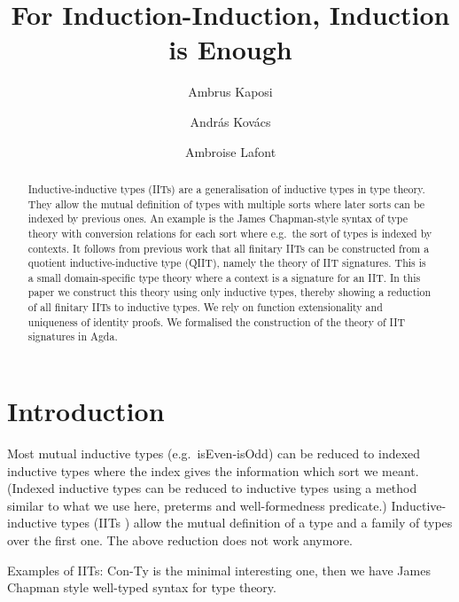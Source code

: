 \documentclass[a4paper,UKenglish,cleveref, autoref]{lipics-v2019}
\title{For Induction-Induction, Induction is Enough} %
\author{Ambrus Kaposi}{E{\"o}tv{\"o}s Lor{\'a}nd University, Budapest, Hungary}{akaposi@inf.elte.hu}{https://orcid.org/0000-0001-9897-8936}{this author was supported by Thematic Excellence Programme, Industry and Digitization Subprogramme (NRDI Office, 2019) and by the European Union, co-financed by the European Social Fund (EFOP-3.6.2-16-2017-00013, Thematic Fundamental Research Collaborations Grounding Innovation in Informatics and Infocommunication).}%
\author{Andr{\'a}s Kov{\'a}cs}{E{\"o}tv{\"o}s Lor{\'a}nd University, Budapest, Hungary}{kovacsandras@inf.elte.hu}{https://orcid.org/0000-0002-6375-9781}{this author was supported by the European Union, co-financed by the European Social Fund (EFOP-3.6.3-VEKOP-16-2017-00002).}
\author{Ambroise Lafont}{IMT Atlantique, Inria, LS2N CNRS, Nantes, France}{ambroise.lafont@inria.fr}{https://orcid.org/0000-0002-9299-641X}{}
\begin{document}
\maketitle

\begin{abstract}
  Inductive-inductive types (IITs) are a generalisation of inductive types in
  type theory. They allow the mutual definition of types with multiple sorts
  where later sorts can be indexed by previous ones. An example is the James
  Chapman-style syntax of type theory with conversion relations for each sort
  where e.g.\ the sort of types is indexed by contexts. It follows from previous
  work that all finitary IITs can be constructed from a quotient
  inductive-inductive type (QIIT), namely the theory of IIT signatures. This is
  a small domain-specific type theory where a context is a signature for an
  IIT. In this paper we construct this theory using only inductive types,
  thereby showing a reduction of all finitary IITs to inductive types.  We rely
  on function extensionality and uniqueness of identity proofs. We formalised
  the construction of the theory of IIT signatures in Agda.

\end{abstract}

\section{Introduction}
\label{sec:intro}




Most mutual inductive types (e.g.\ isEven-isOdd) can be reduced to indexed
inductive types where the index gives the information which sort we
meant. (Indexed inductive types can be reduced to inductive types using a method
similar to what we use here, preterms and well-formedness predicate.)
Inductive-inductive types (IITs \cite{forsberg-phd}) allow the mutual definition
of a type and a family of types over the first one. The above reduction does not
work anymore.

Examples of IITs: Con-Ty is the minimal interesting one, then we have
James Chapman style \cite{chapman09eatitself} well-typed syntax for
type theory.
\end{document}
